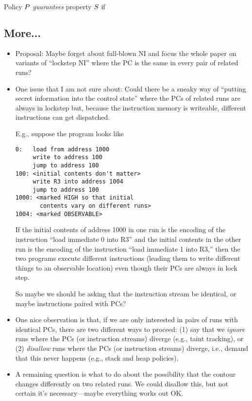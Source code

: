 \documentclass[conference]{IEEEtran}
\begin{document}
Policy $P$ {\em guarantees} property $S$ if 



\iftext
\subsection{More...}
  \begin{itemize}
  \item Proposal: Maybe forget about full-blown NI and focus the whole paper
  on variants of ``lockstep NI'' where the PC is the same in every pair of
  related runs?
  \item One issue that I am not sure about: Could there be a sneaky way of
  ``putting secret information into the control state'' where the PCs of
  related runs are always in lockstep but, because the instruction memory is
  writeable, different instructions can get dispatched.

  E.g., suppose the program looks like
\begin{verbatim}
0:   load from address 1000
     write to address 100
     jump to address 100
100: <initial contents don't matter>
     write R3 into address 1004
     jump to address 100
1000: <marked HIGH so that initial
       contents vary on different runs>
1004: <marked OBSERVABLE>
\end{verbatim}
  If the initial contents of address 1000 in one run is the encoding of the
  instruction ``load immediate 0 into R3'' and the initial contents in the
  other run is the encoding of the instruction ``load immediate 1 into R3,''
  then the two programs execute different instructions (leading them to
  write different things to an observable location) even though their PCs
  are always in lock step.

  So maybe we should be asking that the instruction stream be
  identical, or maybe instructions paired with PCs?


  \item One nice observation is that, if we are only interested in pairs of
  runs with identical PCs, there are two different ways to proceed: (1) say
  that we {\em ignore} runs where the PCs (or instruction streams) diverge
  (e.g., taint tracking), or (2) {\em disallow} runs where the PCs (or
  instruction streams) diverge, i.e., demand that this never happens (e.g.,
  stack and heap policies).
  \item A remaining question is what to do about the possibility that the
  contour changes differently on two related runs.  We could disallow this,
  but not certain it's necessary---maybe everything works out OK.
  \end{itemize}
\fi
\end{document}
